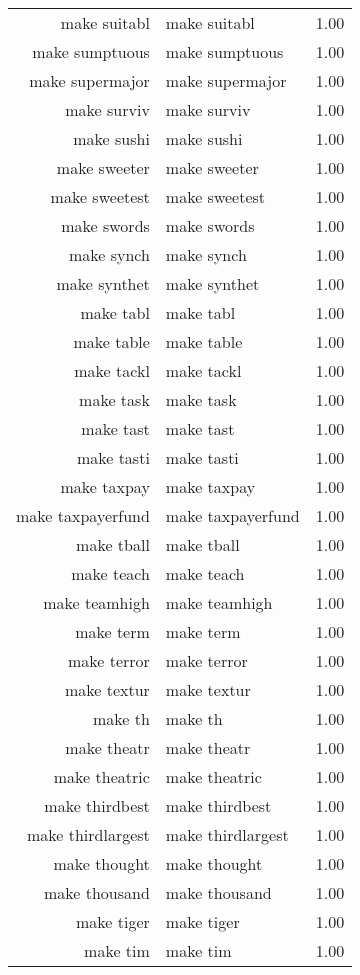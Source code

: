 \begin{table}[ht]
\begin{tabular}{rlr}
  make suitabl & make suitabl & 1.00 \\ 
  make sumptuous & make sumptuous & 1.00 \\ 
  make supermajor & make supermajor & 1.00 \\ 
  make surviv & make surviv & 1.00 \\ 
  make sushi & make sushi & 1.00 \\ 
  make sweeter & make sweeter & 1.00 \\ 
  make sweetest & make sweetest & 1.00 \\ 
  make swords & make swords & 1.00 \\ 
  make synch & make synch & 1.00 \\ 
  make synthet & make synthet & 1.00 \\ 
  make tabl & make tabl & 1.00 \\ 
  make table & make table & 1.00 \\ 
  make tackl & make tackl & 1.00 \\ 
  make task & make task & 1.00 \\ 
  make tast & make tast & 1.00 \\ 
  make tasti & make tasti & 1.00 \\ 
  make taxpay & make taxpay & 1.00 \\ 
  make taxpayerfund & make taxpayerfund & 1.00 \\ 
  make tball & make tball & 1.00 \\ 
  make teach & make teach & 1.00 \\ 
  make teamhigh & make teamhigh & 1.00 \\ 
  make term & make term & 1.00 \\ 
  make terror & make terror & 1.00 \\ 
  make textur & make textur & 1.00 \\ 
  make th & make th & 1.00 \\ 
  make theatr & make theatr & 1.00 \\ 
  make theatric & make theatric & 1.00 \\ 
  make thirdbest & make thirdbest & 1.00 \\ 
  make thirdlargest & make thirdlargest & 1.00 \\ 
  make thought & make thought & 1.00 \\ 
  make thousand & make thousand & 1.00 \\ 
  make tiger & make tiger & 1.00 \\ 
  make tim & make tim & 1.00 \\ 

\end{tabular}
\end{table}

